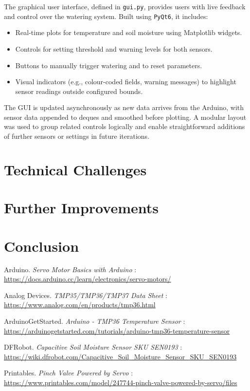 \documentclass[a4paper,11pt]{article}
\begin{document}
The graphical user interface, defined in \texttt{gui.py}, 
provides users with live feedback and control over the watering system. 
Built using \texttt{PyQt6}, it includes:

\begin{itemize}
    \item Real-time plots for temperature and soil moisture using Matplotlib widgets.
    \item Controls for setting threshold and warning levels for both sensors.
    \item Buttons to manually trigger watering and to reset parameters.
    \item Visual indicators (e.g., colour-coded fields, warning messages) 
    to highlight sensor readings outside configured bounds.
\end{itemize}

The GUI is updated asynchronously as new data arrives from the Arduino, 
with sensor data appended to deques and smoothed before plotting. 
A modular layout was used to group related controls logically and 
enable straightforward additions of further sensors or settings in future iterations.

\section{Technical Challenges}
\label{sec:technical_problems}

\section{Further Improvements}
\label{sec:further_improvements}

\section{Conclusion}
\label{sec:conclusion}

\begin{thebibliography}{9}

Arduino. \textit{Servo Motor Basics with Arduino} : \\
\url{https://docs.arduino.cc/learn/electronics/servo-motors/}

Analog Devices. \textit{TMP35/TMP36/TMP37 Data Sheet} : \\
\url{https://www.analog.com/en/products/tmp36.html} 

ArduinoGetStarted. \textit{Arduino - TMP36 Temperature Sensor} : \\
\url{https://arduinogetstarted.com/tutorials/arduino-tmp36-temperature-sensor}

DFRobot. \textit{Capacitive Soil Moisture Sensor SKU SEN0193} : \\
\url{https://wiki.dfrobot.com/Capacitive_Soil_Moisture_Sensor_SKU_SEN0193}

Printables. \textit{Pinch Valve Powered by Servo} : \\
\url{https://www.printables.com/model/247744-pinch-valve-powered-by-servo/files}

\end{thebibliography}
\end{document}
